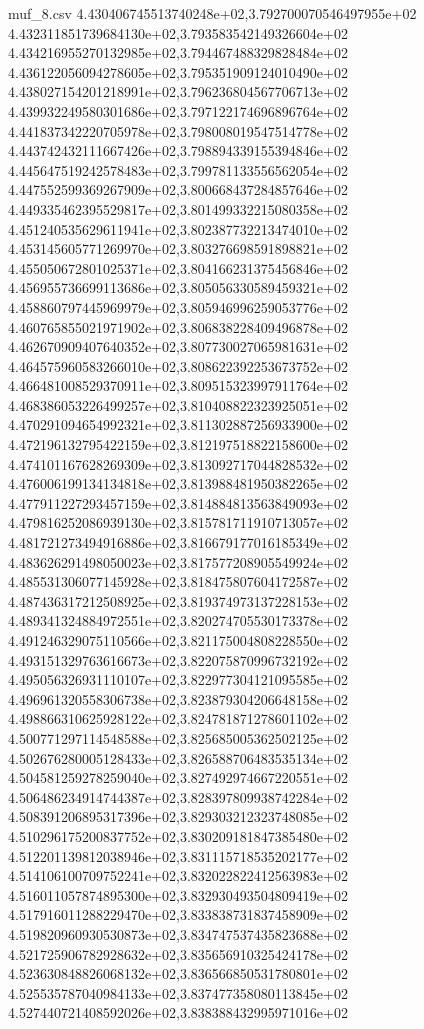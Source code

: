 \begin{filecontents*}{muf_8.csv}
4.430406745513740248e+02,3.792700070546497955e+02
4.432311851739684130e+02,3.793583542149326604e+02
4.434216955270132985e+02,3.794467488329828484e+02
4.436122056094278605e+02,3.795351909124010490e+02
4.438027154201218991e+02,3.796236804567706713e+02
4.439932249580301686e+02,3.797122174696896764e+02
4.441837342220705978e+02,3.798008019547514778e+02
4.443742432111667426e+02,3.798894339155394846e+02
4.445647519242578483e+02,3.799781133556562054e+02
4.447552599369267909e+02,3.800668437284857646e+02
4.449335462395529817e+02,3.801499332215080358e+02
4.451240535629611941e+02,3.802387732213474010e+02
4.453145605771269970e+02,3.803276698591898821e+02
4.455050672801025371e+02,3.804166231375456846e+02
4.456955736699113686e+02,3.805056330589459321e+02
4.458860797445969979e+02,3.805946996259053776e+02
4.460765855021971902e+02,3.806838228409496878e+02
4.462670909407640352e+02,3.807730027065981631e+02
4.464575960583266010e+02,3.808622392253673752e+02
4.466481008529370911e+02,3.809515323997911764e+02
4.468386053226499257e+02,3.810408822323925051e+02
4.470291094654992321e+02,3.811302887256933900e+02
4.472196132795422159e+02,3.812197518822158600e+02
4.474101167628269309e+02,3.813092717044828532e+02
4.476006199134134818e+02,3.813988481950382265e+02
4.477911227293457159e+02,3.814884813563849093e+02
4.479816252086939130e+02,3.815781711910713057e+02
4.481721273494916886e+02,3.816679177016185349e+02
4.483626291498050023e+02,3.817577208905549924e+02
4.485531306077145928e+02,3.818475807604172587e+02
4.487436317212508925e+02,3.819374973137228153e+02
4.489341324884972551e+02,3.820274705530173378e+02
4.491246329075110566e+02,3.821175004808228550e+02
4.493151329763616673e+02,3.822075870996732192e+02
4.495056326931110107e+02,3.822977304121095585e+02
4.496961320558306738e+02,3.823879304206648158e+02
4.498866310625928122e+02,3.824781871278601102e+02
4.500771297114548588e+02,3.825685005362502125e+02
4.502676280005128433e+02,3.826588706483535134e+02
4.504581259278259040e+02,3.827492974667220551e+02
4.506486234914744387e+02,3.828397809938742284e+02
4.508391206895317396e+02,3.829303212323748085e+02
4.510296175200837752e+02,3.830209181847385480e+02
4.512201139812038946e+02,3.831115718535202177e+02
4.514106100709752241e+02,3.832022822412563983e+02
4.516011057874895300e+02,3.832930493504809419e+02
4.517916011288229470e+02,3.833838731837458909e+02
4.519820960930530873e+02,3.834747537435823688e+02
4.521725906782928632e+02,3.835656910325424178e+02
4.523630848826068132e+02,3.836566850531780801e+02
4.525535787040984133e+02,3.837477358080113845e+02
4.527440721408592026e+02,3.838388432995971016e+02

\end{filecontents*}
